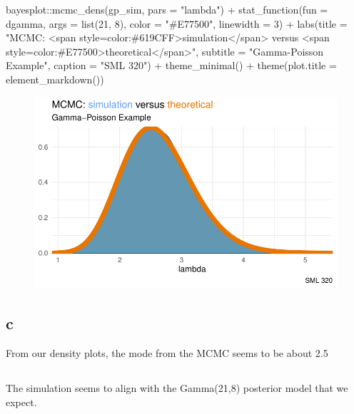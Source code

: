 \documentclass[
  letterpaper,
  DIV=11,
  numbers=noendperiod]{scrartcl}
\newenvironment{Shaded}{\begin{snugshade}}{\end{snugshade}}
\newcommand{\AttributeTok}[1]{\textcolor[rgb]{0.40,0.45,0.13}{#1}}
\newcommand{\DecValTok}[1]{\textcolor[rgb]{0.68,0.00,0.00}{#1}}
\newcommand{\FunctionTok}[1]{\textcolor[rgb]{0.28,0.35,0.67}{#1}}
\newcommand{\NormalTok}[1]{\textcolor[rgb]{0.00,0.23,0.31}{#1}}
\newcommand{\SpecialCharTok}[1]{\textcolor[rgb]{0.37,0.37,0.37}{#1}}
\newcommand{\StringTok}[1]{\textcolor[rgb]{0.13,0.47,0.30}{#1}}
\begin{document}
\begin{Shaded}
\begin{Highlighting}[]
\NormalTok{bayesplot}\SpecialCharTok{::}\FunctionTok{mcmc\_dens}\NormalTok{(gp\_sim, }\AttributeTok{pars =} \StringTok{"lambda"}\NormalTok{) }\SpecialCharTok{+} 
  \FunctionTok{stat\_function}\NormalTok{(}\AttributeTok{fun =}\NormalTok{ dgamma, }\AttributeTok{args =} \FunctionTok{list}\NormalTok{(}\DecValTok{21}\NormalTok{, }\DecValTok{8}\NormalTok{),}
                \AttributeTok{color =} \StringTok{"\#E77500"}\NormalTok{, }\AttributeTok{linewidth =} \DecValTok{3}\NormalTok{) }\SpecialCharTok{+} 
  \FunctionTok{labs}\NormalTok{(}\AttributeTok{title =} \StringTok{"MCMC: \textless{}span style=\textquotesingle{}color:\#619CFF\textquotesingle{}\textgreater{}simulation\textless{}/span\textgreater{} versus \textless{}span style=\textquotesingle{}color:\#E77500\textquotesingle{}\textgreater{}theoretical\textless{}/span\textgreater{}"}\NormalTok{,}
         \AttributeTok{subtitle =} \StringTok{"Gamma{-}Poisson Example"}\NormalTok{,}
         \AttributeTok{caption =} \StringTok{"SML 320"}\NormalTok{) }\SpecialCharTok{+}
  \FunctionTok{theme\_minimal}\NormalTok{() }\SpecialCharTok{+}
  \FunctionTok{theme}\NormalTok{(}\AttributeTok{plot.title =} \FunctionTok{element\_markdown}\NormalTok{())}
\end{Highlighting}
\end{Shaded}

\begin{figure}[H]

{\centering \includegraphics{ps4_code_files/figure-pdf/unnamed-chunk-23-1.pdf}

}

\end{figure}

\hypertarget{c-4}{%
\subsection{c}\label{c-4}}

From our density plots, the mode from the MCMC seems to be about 2.5

\hypertarget{section-8}{%
\subsection{}\label{section-8}}

The simulation seems to align with the Gamma(21,8) posterior model that
we expect.
\end{document}
